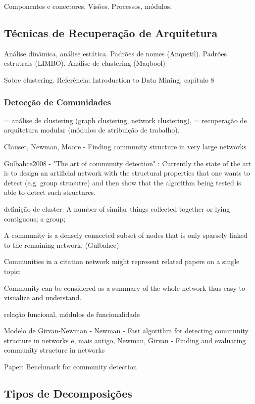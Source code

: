 \documentclass{article}
\begin{document}
Componentes e conectores.
Visões. Processos, módulos.

\subsection{Técnicas de Recuperação de Arquitetura}


Análise dinâmica, análise estática. Padrões de nomes (Anquetil). Padrões estrutrais (LIMBO). Análise de clustering (Maqbool)



Sobre clustering. Referência: Introduction to Data Mining, capítulo 8

\subsubsection{Detecção de Comunidades}

= análise de clustering (graph clustering, network clustering), = recuperação de arquitetura modular (módulos de atribuição de trabalho).

Clauset, Newman, Moore - Finding community structure in very large networks \cite{Clauset2004}

Gulbahce2008 - "The art of community detection" \cite{Gulbahce2008}: Currently the state of the art is to design an artificial network with the structural properties that one wants to detect (e.g. group strucutre) and then show that the algorithm being tested is able to detect such structures. 

definição de cluster: A number of similar things collected together or lying contiguous; a group;

A community is
a densely connected subset of nodes that is only sparsely
linked to the remaining network. (Gulbahce)

Communities in a citation network might represent
related papers on a single topic;

Community can be considered as a summary of
the whole network thus easy to visualize and
understand.

relação funcional, módulos de funcionalidade


Modelo de Girvan-Newman - Newman - Fast algorithm for detecting community structure in networks \cite{Newman2004b} e, mais antigo, Newman, Girvan - Finding and evaluating community structure in networks \cite{Newman2004a}

Paper: Benchmark for community detection \cite{Lancichinetti2008}


\subsection{Tipos de Decomposições}
\end{document}
